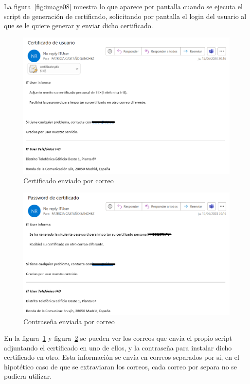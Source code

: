 \documentclass[a4paper, 12pt]{book}
\begin{document}
\begin{itemize}
La figura~\ref{fig:image08} muestra lo que aparece por pantalla cuando se ejecuta el script de generación de certificado, solicitando por pantalla el login del usuario al que se le quiere generar y enviar dicho certificado.

\begin{figure}
	\centering
	\includegraphics[width=17cm, keepaspectratio]{img/image09.png}
	\caption{Certificado enviado por correo}
	\label{fig:image09}
\end{figure}

\begin{figure}
	\centering
	\includegraphics[width=17cm, keepaspectratio]{img/image10.png}
	\caption{Contraseña enviada por correo}
	\label{fig:image10}
\end{figure}

En la figura~\ref{fig:image09} y figura~\ref{fig:image10} se pueden ver los correos que envía el propio script adjuntando el certificado en uno de ellos, y la contraseña para instalar dicho certificado en otro. Esta información se envía en correos separados por si, en el hipotético caso de que se extraviaran los correos, cada correo por separa no se pudiera utilizar.


\end{itemize}
\end{document}
